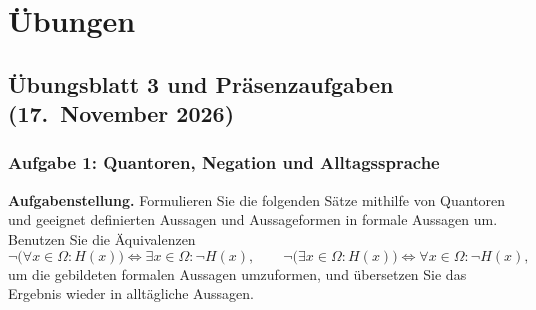 \clearpage
\section{Übungen}

\subsection{Übungsblatt 3 und Präsenzaufgaben (17.\ November 2026)}

\subsubsection*{Aufgabe 1: Quantoren, Negation und Alltagssprache}

\noindent\textbf{Aufgabenstellung.}
Formulieren Sie die folgenden Sätze mithilfe von Quantoren und geeignet definierten Aussagen und Aussageformen in formale Aussagen um. Benutzen Sie die Äquivalenzen
\[
    \neg\bigl(\forall x\in\Omega : H(x)\bigr) \iff \exists x\in\Omega : \neg H(x),
    \qquad
    \neg\bigl(\exists x\in\Omega : H(x)\bigr) \iff \forall x\in\Omega : \neg H(x),
\]
um die gebildeten formalen Aussagen umzuformen, und übersetzen Sie das Ergebnis wieder in alltägliche Aussagen.

